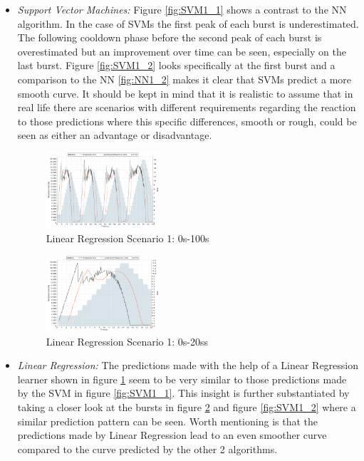\begin{itemize}
\item \textit{Support Vector Machines:} Figure \ref*{fig:SVM1_1} shows a contrast to the NN algorithm. In the case of SVMs the first peak of each burst is underestimated. The following cooldown phase before the second peak of each burst is overestimated but an improvement over time can be seen, especially on the last burst. Figure \ref{fig:SVM1_2} looks specifically at the first burst and a comparison to the NN \ref*{fig:NN1_2} makes it clear that SVMs predict a more smooth curve. It should be kept in mind that it is realistic to assume that in real life there are scenarios with different requirements regarding the reaction to those predictions where this specific differences, smooth or rough, could be seen as either an advantage or disadvantage.


\begin{figure}[ht]
	\begin{center}
		\includegraphics[width=0.40\textwidth]{chapters/chapter5/fig/LR1_1}
	\end{center}
	\caption{Linear Regression Scenario 1: 0s-100s}
	\label{fig:LR1_1}
\end{figure}

\begin{figure}[ht]
	\begin{center}
		\includegraphics[width=0.40\textwidth]{chapters/chapter5/fig/LR1_2}
	\end{center}
	\caption{Linear Regression Scenario 1: 0s-20ss}
	\label{fig:LR1_2}
\end{figure}

\item \textit{Linear Regression:} The predictions made with the help of a Linear Regression learner shown in figure \ref*{fig:LR1_1} seem to be very similar to those predictions made by the SVM in figure \ref*{fig:SVM1_1}. This insight is further substantiated by taking a closer look at the bursts in figure \ref*{fig:LR1_2} and figure \ref*{fig:SVM1_2} where a similar prediction pattern can be seen. Worth mentioning is that the predictions made by Linear Regression lead to an even smoother curve compared to the curve predicted by the other 2 algorithms.
\end{itemize}

